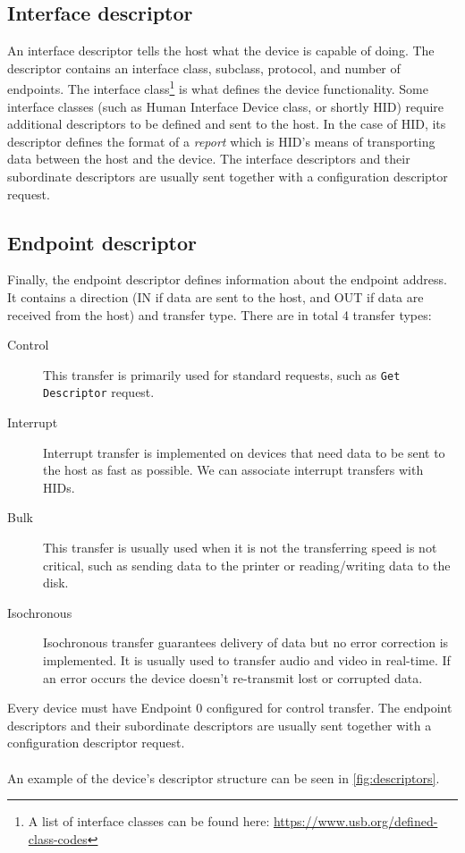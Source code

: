 \subsection*{Interface descriptor}
An interface descriptor tells the host what the device is capable of doing. The descriptor contains an interface class, subclass, protocol, and number of endpoints. The interface class\footnote{A list of interface classes can be found here: \url{https://www.usb.org/defined-class-codes}} is what defines the device functionality. Some interface classes (such as Human Interface Device class, or shortly HID) require additional descriptors to be defined and sent to the host. In the case of HID, its descriptor defines the format of a \emph{report} which is HID's means of transporting data between the host and the device. The interface descriptors and their subordinate descriptors are usually sent together with a configuration descriptor request.

\subsection*{Endpoint descriptor}
Finally, the endpoint descriptor defines information about the endpoint address. It contains a direction (IN if data are sent to the host, and OUT if data are received from the host) and transfer type. There are in total 4 transfer types:
\begin{description}
    \item [Control] This transfer is primarily used for standard requests, such as \verb|Get Descriptor| request.
    \item [Interrupt] Interrupt transfer is implemented on devices that need data to be sent to the host as fast as possible. We can associate interrupt transfers with HIDs.
    \item [Bulk] This transfer is usually used when it is not the transferring speed is not critical, such as sending data to the printer or reading/writing data to the disk.
    \item [Isochronous] Isochronous transfer guarantees delivery of data but no error correction is implemented. It is usually used to transfer audio and video in real-time. If an error occurs the device doesn't re-transmit lost or corrupted data.
\end{description}
Every device must have Endpoint 0 configured for control transfer. The endpoint descriptors and their subordinate descriptors are usually sent together with a configuration descriptor request.
\\ \\
An example of the device's descriptor structure can be seen in \autoref{fig:descriptors}.

